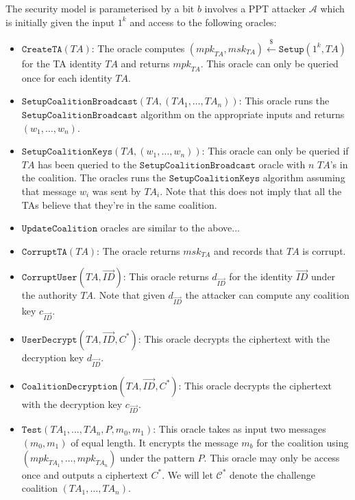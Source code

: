 \documentclass{llncs}
\newcommand{\A}{\mathcal{A}}
\newcommand{\ID}{\mathit{ID}}
\newcommand{\TA}{\mathit{TA}}
\newcommand{\mpk}{\mathit{mpk}}
\newcommand{\msk}{\mathit{msk}}
\newcommand{\getsr}{\stackrel{{\scriptscriptstyle\$}}{\gets}}
\begin{document}
The security model is parameterised by a bit $b$ involves a PPT
attacker $\A$ which is initially given the input $1^k$ and access to
the following oracles:
\begin{itemize}
\item $\texttt{CreateTA}(\TA)$: The oracle computes
$(\mpk_{\TA},\msk_{\TA})\getsr \texttt{Setup}(1^{k},\TA)$ for the TA
identity $\TA$ and returns $\mpk_{\TA}$. This oracle can only be
queried once for each identity $\TA$.\medskip

\item
$\texttt{SetupCoalitionBroadcast}(\TA,(\TA_{1},\ldots,\TA_{n}))$:
This oracle runs the $\texttt{SetupCoalitionBroadcast}$ algorithm on
the appropriate inputs and returns $(w_{1},\ldots,w_{n})$.\medskip

\item $\texttt{SetupCoalitionKeys}(\TA, (w_{1},\ldots,w_{n}))$: This
oracle can only be queried if $\TA$ has been queried to the
$\texttt{SetupCoalitionBroadcast}$ oracle with $n$ $\TA$'s in the
coalition. The oracles runs the $\texttt{SetupCoalitionKeys}$
algorithm assuming that message $w_{i}$ was sent by $\TA_{i}$. Note
that this does not imply that all the TAs believe that they're in
the same coalition.\medskip

\item $\texttt{UpdateCoalition}$ oracles are similar to the
above...\medskip

\item $\texttt{CorruptTA}(\TA)$: The oracle returns $\msk_{\TA}$ and
records that $\TA$ is corrupt.\medskip

\item $\texttt{CorruptUser}(\TA,\vec{\ID})$: This oracle returns
$d_{\vec{\ID}}$ for the identity $\vec{\ID}$ under the authority
$\TA$. Note that given $d_{\vec{\ID}}$ the attacker can compute any
coalition key $c_{\vec{\ID}}$. \medskip

\item $\texttt{UserDecrypt}(\TA,\vec{\ID},C^{*})$: This oracle
decrypts the ciphertext with the decryption key
$d_{\vec{\ID}}$.\medskip

\item $\texttt{CoalitionDecryption}(\TA,\vec{\ID},C^{*})$: This oracle
decrypts the ciphertext with the decryption key
$c_{\vec{\ID}}$.\medskip

\item
$\texttt{Test}(\TA_{1},\ldots,\TA_{n},\mathit{P},m_{0},m_{1})$: This
oracle takes as input two messages $(m_{0},m_{1})$ of equal length.
It encrypts the message $m_{b}$ for the coalition using
$(\mpk_{\TA_{1}},\ldots,\mpk_{\TA_{n}})$ under the pattern
$\mathit{P}$. This oracle may only be access once and outputs a
ciphertext $C^{*}$. We will let $\mathcal{C}^{*}$ denote the
challenge coalition $(\TA_{1},\ldots,\TA_{n})$.
\end{itemize}
\end{document}
